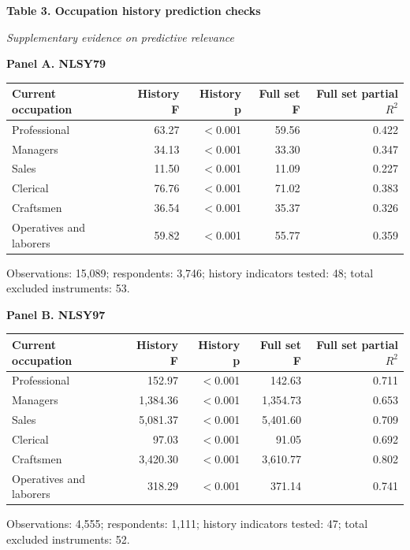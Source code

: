 \begin{center}
{\large\bfseries Table 3. Occupation history prediction checks}\par
\smallskip
\textit{Supplementary evidence on predictive relevance}\par
\medskip
\end{center}
\small
\noindent\textbf{Panel A. NLSY79}\par\smallskip
\noindent\begin{tabular*}{\textwidth}{@{\extracolsep{\fill}}lrrrr@{}}
\toprule
Current occupation & History F & History p & Full set F & Full set partial $R^2$ \\
\midrule
Professional & 63.27 & $<$0.001 & 59.56 & 0.422 \\
Managers & 34.13 & $<$0.001 & 33.30 & 0.347 \\
Sales & 11.50 & $<$0.001 & 11.09 & 0.227 \\
Clerical & 76.76 & $<$0.001 & 71.02 & 0.383 \\
Craftsmen & 36.54 & $<$0.001 & 35.37 & 0.326 \\
Operatives and laborers & 59.82 & $<$0.001 & 55.77 & 0.359 \\
\bottomrule
\end{tabular*}\par\smallskip
{\footnotesize Observations: 15,089; respondents: 3,746; history indicators tested: 48; total excluded instruments: 53.\par}
\medskip
\noindent\textbf{Panel B. NLSY97}\par\smallskip
\noindent\begin{tabular*}{\textwidth}{@{\extracolsep{\fill}}lrrrr@{}}
\toprule
Current occupation & History F & History p & Full set F & Full set partial $R^2$ \\
\midrule
Professional & 152.97 & $<$0.001 & 142.63 & 0.711 \\
Managers & 1,384.36 & $<$0.001 & 1,354.73 & 0.653 \\
Sales & 5,081.37 & $<$0.001 & 5,401.60 & 0.709 \\
Clerical & 97.03 & $<$0.001 & 91.05 & 0.692 \\
Craftsmen & 3,420.30 & $<$0.001 & 3,610.77 & 0.802 \\
Operatives and laborers & 318.29 & $<$0.001 & 371.14 & 0.741 \\
\bottomrule
\end{tabular*}\par\smallskip
{\footnotesize Observations: 4,555; respondents: 1,111; history indicators tested: 47; total excluded instruments: 52.\par}
